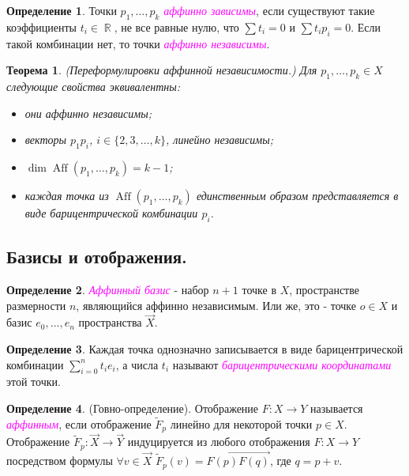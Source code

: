 \documentclass[a4paper,100pt]{article}
\theoremstyle{indented}
\newtheorem{theorem}{Теорема}
\theoremstyle{definition}
\newtheorem{defn}{Определение}
\theoremstyle{remark}
\DeclareMathOperator{\ra}{\rightarrow}
\DeclareMathOperator{\RR}{\mathbb{R}}
\DeclareMathOperator{\Aff}{Aff}
\begin{document}
\begin{defn}
    Точки $p_1, \ldots, p_k$ \textit{\textcolor{magenta}{\hypertarget{s22}{аффинно зависимы}}}, если существуют такие коэффициенты $t_i \in \RR$, не все равные нулю, что $\sum t_i = 0$ и $\sum t_ip_i = 0$. Если такой комбинации нет, то точки \textit{\textcolor{magenta}{\hypertarget{s23}{аффинно независимы}}}.
\end{defn}

\begin{theorem}
    (Переформулировки аффинной независимости.) Для $p_1, \ldots, p_k \in X$ следующие свойства эквивалентны: 

    \begin{itemize}
        \item они аффинно независимы; 
        \item векторы $p_1 p_i$, $i\in \{2, 3, \ldots, k\}$, линейно независимы; 
        \item $\dim \Aff (p_1, \ldots, p_k)=k-1$; 
        \item каждая точка из $\Aff(p_1, \ldots, p_k)$ единственным образом представляется в виде барицентрической комбинации $p_i$. 
    \end{itemize}
\end{theorem}

\subsection{Базисы и отображения.}

\begin{defn}
    \textit{\textcolor{magenta}{\hypertarget{s24}{Аффинный базис}}} - набор $n+1$ точке в $X$, пространстве размерности $n$, являющийся аффинно независимым. Или же, это - точке $o\in X$ и базис $e_0, \ldots, e_n$ пространства $\vec{X}$. 
\end{defn}

\begin{defn}
    Каждая точка однозначно записывается в виде барицентрической комбинации $\sum_{i=0}^n t_i e_i$, а числа $t_i$ называют \textit{\textcolor{magenta}{\hypertarget{s25}{барицентрическими координатами}}} этой точки.
\end{defn}

\begin{defn}
    (Говно-определение). Отображение $F:X\ra Y$ называется \textit{\textcolor{magenta}{\hypertarget{s26}{аффинным}}}, если отображение $\tilde{F}_p$ линейно для некоторой точки $p\in X$. Отображение $\tilde{F}_p:\vec{X}\ra\vec{Y}$ индуцируется из любого отображения $F:X\ra Y$ посредством формулы $\forall v\in \vec{X}$ $\tilde{F}_p(v)=\overrightarrow{F(p)F(q)}$, где $q=p+v$. 
\end{defn}
\end{document}
